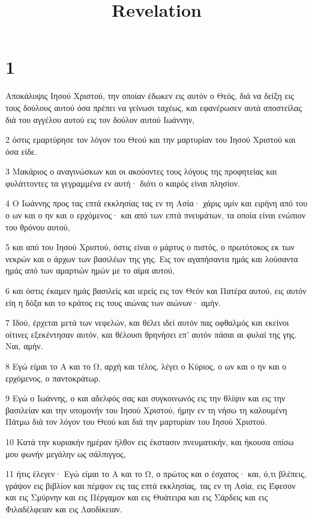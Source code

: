 

\title{Revelation}


\chapter{1}

\par Αποκάλυψις Ιησού Χριστού, την οποίαν έδωκεν εις αυτόν ο Θεός, διά να δείξη εις τους δούλους αυτού όσα πρέπει να γείνωσι ταχέως, και εφανέρωσεν αυτά αποστείλας διά του αγγέλου αυτού εις τον δούλον αυτού Ιωάννην,
\par 2 όστις εμαρτύρησε τον λόγον του Θεού και την μαρτυρίαν του Ιησού Χριστού και όσα είδε.
\par 3 Μακάριος ο αναγινώσκων και οι ακούοντες τους λόγους της προφητείας και φυλάττοντες τα γεγραμμένα εν αυτή· διότι ο καιρός είναι πλησίον.
\par 4 Ο Ιωάννης προς τας επτά εκκλησίας τας εν τη Ασία· χάρις υμίν και ειρήνη από του ο ων και ο ην και ο ερχόμενος· και από των επτά πνευμάτων, τα οποία είναι ενώπιον του θρόνου αυτού,
\par 5 και από του Ιησού Χριστού, όστις είναι ο μάρτυς ο πιστός, ο πρωτότοκος εκ των νεκρών και ο άρχων των βασιλέων της γης. Εις τον αγαπήσαντα ημάς και λούσαντα ημάς από των αμαρτιών ημών με το αίμα αυτού,
\par 6 και όστις έκαμεν ημάς βασιλείς και ιερείς εις τον Θεόν και Πατέρα αυτού, εις αυτόν είη η δόξα και το κράτος εις τους αιώνας των αιώνων· αμήν.
\par 7 Ιδού, έρχεται μετά των νεφελών, και θέλει ιδεί αυτόν πας οφθαλμός και εκείνοι οίτινες εξεκέντησαν αυτόν, και θέλουσι θρηνήσει επ' αυτόν πάσαι αι φυλαί της γης. Ναι, αμήν.
\par 8 Εγώ είμαι το Α και το Ω, αρχή και τέλος, λέγει ο Κύριος, ο ων και ο ην και ο ερχόμενος, ο παντοκράτωρ.
\par 9 Εγώ ο Ιωάννης, ο και αδελφός σας και συγκοινωνός εις την θλίψιν και εις την βασιλείαν και την υπομονήν του Ιησού Χριστού, ήμην εν τη νήσω τη καλουμένη Πάτμω διά τον λόγον του Θεού και διά την μαρτυρίαν του Ιησού Χριστού.
\par 10 Κατά την κυριακήν ημέραν ήλθον εις έκστασιν πνευματικήν, και ήκουσα οπίσω μου φωνήν μεγάλην ως σάλπιγγος,
\par 11 ήτις έλεγεν· Εγώ είμαι το Α και το Ω, ο πρώτος και ο έσχατος· και, ό,τι βλέπεις, γράψον εις βιβλίον και πέμψον εις τας επτά εκκλησίας, τας εν τη Ασία, εις Έφεσον και εις Σμύρνην και εις Πέργαμον και εις Θυάτειρα και εις Σάρδεις και εις Φιλαδέλφειαν και εις Λαοδίκειαν.
